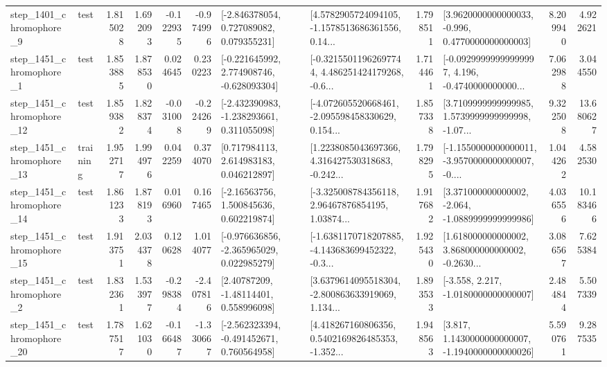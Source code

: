 \begin{tabular}{llrrrrllrlrr}
  step\_1401\_chromophore\_9 &      test &      1.815028 &    1.692093 &     -0.122935 & -0.974996 &    [-2.846378054, 0.727089082, 0.079355231] &  [4.5782905724094105, -1.1578513686361556, 0.14... &       1.798511 &   [3.9620000000000033, -0.996, 0.4770000000000003] &            8.209940 &          4.922621 \\
  step\_1451\_chromophore\_1 &      test &      1.853885 &    1.878530 &      0.024645 &  0.230223 &   [-0.221645992, 2.774908746, -0.628093304] &  [-0.32155011962697744, 4.486251424179268, -0.6... &       1.714461 &  [-0.09299999999999997, 4.196, -0.4740000000000... &            7.062988 &          3.044550 \\
 step\_1451\_chromophore\_12 &      test &      1.859382 &    1.828374 &     -0.031008 & -0.224269 &   [-2.432390983, -1.238293661, 0.311055098] &  [-4.072605520668461, -2.095598458330629, 0.154... &       1.857338 &  [3.7109999999999985, 1.5739999999999998, -1.07... &            9.322508 &         13.680627 \\
 step\_1451\_chromophore\_13 &  training &      1.952717 &    1.994976 &      0.042259 &  0.374070 &     [0.717984113, 2.614983183, 0.046212897] &  [1.2238085043697366, 4.316427530318683, -0.242... &       1.798295 &  [-1.1550000000000011, -3.9570000000000007, -0.... &            1.044262 &          4.582530 \\
 step\_1451\_chromophore\_14 &      test &      1.861233 &    1.878193 &      0.016960 &  0.167465 &     [-2.16563756, 1.500845636, 0.602219874] &  [-3.325008784356118, 2.96467876854195, 1.03874... &       1.917682 &   [3.371000000000002, -2.064, -1.0889999999999986] &            4.036556 &         10.183466 \\
 step\_1451\_chromophore\_15 &      test &      1.913751 &    2.034378 &      0.120628 &  1.014077 &   [-0.976636856, -2.365965029, 0.022985279] &  [-1.6381170718207885, -4.143683699452322, -0.3... &       1.925430 &  [1.618000000000002, 3.868000000000002, -0.2630... &            3.086567 &          7.625384 \\
  step\_1451\_chromophore\_2 &      test &      1.832361 &    1.533977 &     -0.298384 & -2.407816 &      [2.40787209, -1.48114401, 0.558996098] &  [3.6379614095518304, -2.800863633919069, 1.134... &       1.893533 &               [-3.558, 2.217, -1.0180000000000007] &            2.484844 &          5.507339 \\
 step\_1451\_chromophore\_20 &      test &      1.787517 &    1.621030 &     -0.166487 & -1.330667 &   [-2.562323394, -0.491452671, 0.760564958] &  [4.418267160806356, 0.5402169826485353, -1.352... &       1.948563 &   [3.817, 1.1430000000000007, -1.1940000000000026] &            5.590761 &          9.287535 \\

\end{tabular}
